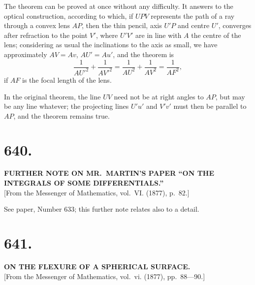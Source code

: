 \documentclass[11pt,a4paper]{book}
\begin{document}
The theorem can be proved at once without any difficulty. It answers to the optical construction, according to which, if $UPV$ represents the path of a ray through a convex lens $AP$, then the thin pencil, axis $U'P$ and centre $U'$, converges after refraction to the point $V'$, where $U'V'$ are in line with $A$ the centre of the lens; considering as usual the inclinations to the axis as small, we have approximately $AV = Av$, $AU' = Au'$, and the theorem is
\[
\frac{1}{AU'^2} + \frac{1}{AV'^2} = \frac{1}{AU^2} + \frac{1}{AV^2} = \frac{1}{AF^2},
\]
if $AF$ is the focal length of the lens.

In the original theorem, the line $UV$ need not be at right angles to $AP$, but may be any line whatever; the projecting lines $U'u'$ and $V'v'$ must then be parallel to $AP$, and the theorem remains true.

\clearpage
\setcounter{page}{29}

\section*{640.}

\begin{center}
\textbf{FURTHER NOTE ON MR.~MARTIN'S PAPER ``ON THE INTEGRALS OF SOME DIFFERENTIALS.''}\\[1em]
[From the Messenger of Mathematics, vol.~VI. (1877), p.~82.]
\end{center}

See paper, Number 633; this further note relates also to a detail.

\clearpage
\setcounter{page}{30}

\section*{641.}

\begin{center}
\textbf{ON THE FLEXURE OF A SPHERICAL SURFACE.}\\[1em]
[From the Messenger of Mathematics, vol.~vi. (1877), pp.~88---90.]
\end{center}
\end{document}
